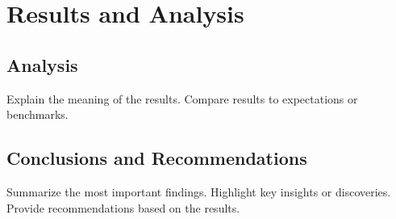 \section{Results and Analysis}

\subsection{Analysis}
Explain the meaning of the results. 
Compare results to expectations or benchmarks. 

\subsection{Conclusions and Recommendations}
Summarize the most important findings. 
Highlight key insights or discoveries. 
Provide recommendations based on the results. 
